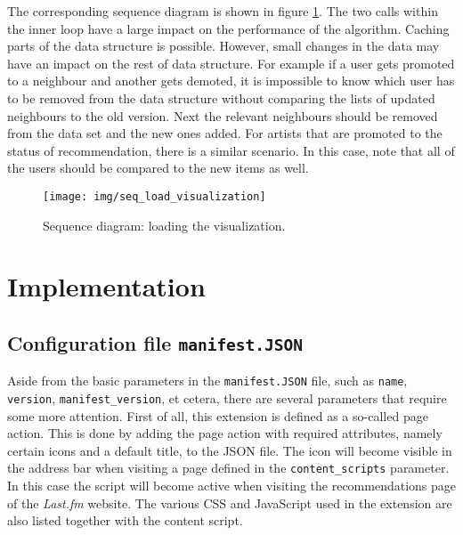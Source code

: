The corresponding sequence diagram is shown in figure \ref{fig:sequence:loadingvis}. The two calls within the inner loop have a large impact on the performance of the algorithm. Caching parts of the data structure is possible. However, small changes in the data may have an impact on the rest of data structure. For example if a user gets promoted to a neighbour and another gets demoted, it is impossible to know which user has to be removed from the data structure without comparing the lists of updated neighbours to the old version. Next the relevant neighbours should be removed from the data set and the new ones added. For artists that are promoted to the status of recommendation, there is a similar scenario. In this case, note that all of the users should be compared to the new items as well.


\begin{figure}%
	\begin{center}
		\texttt{[image: img/seq\_load\_visualization]}%
	\end{center}
	\caption{Sequence diagram: loading the visualization.}%
	\label{fig:sequence:loadingvis}%
\end{figure}



\section{Implementation}\label{chapter:implementation:section:implementation}

\subsection{Configuration file \texttt{manifest.JSON}}\label{chapter:implementation:section:implementation:subsection:configuration}

Aside from the basic parameters in the \texttt{manifest.JSON} file, such as \texttt{name}, \texttt{version}, \texttt{manifest\_version}, et cetera, there are several parameters that require some more attention. First of all, this extension is defined as a so-called page action. This is done by adding the page action with required attributes, namely certain icons and a default title, to the JSON file. The icon will become visible in the address bar when visiting a page defined in the \texttt{content\_scripts} parameter. In this case the script will become active when visiting the recommendations page of the \emph{Last.fm} website. The various CSS and JavaScript used in the extension are also listed together with the content script.


